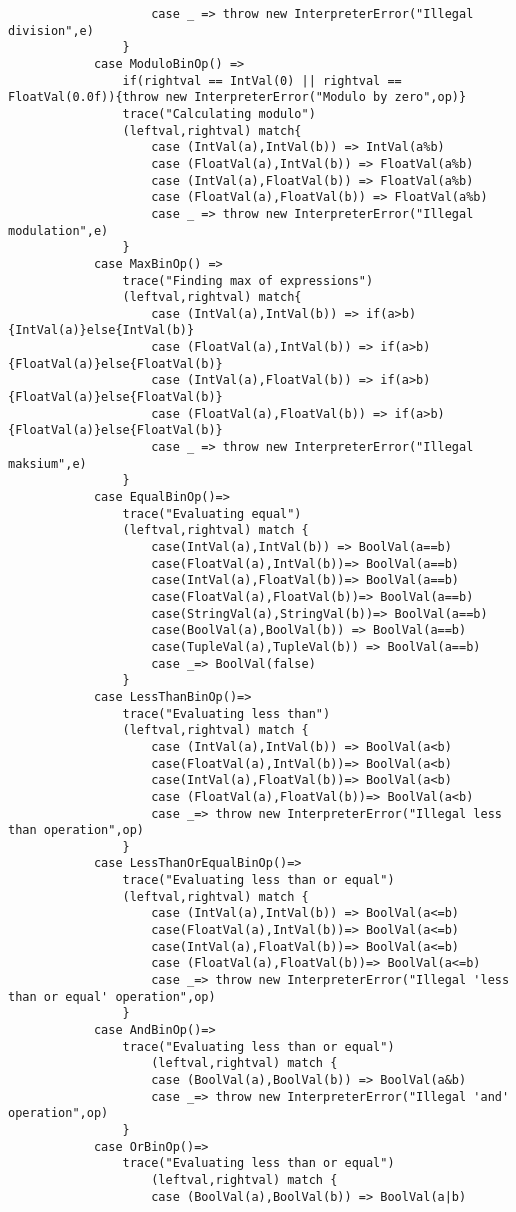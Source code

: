 \documentclass[a4paper, 10pt]{article}
\begin{document}
\begin{lstlisting}
					case _ => throw new InterpreterError("Illegal division",e)
				}
			case ModuloBinOp() =>
				if(rightval == IntVal(0) || rightval == FloatVal(0.0f)){throw new InterpreterError("Modulo by zero",op)}
				trace("Calculating modulo")
				(leftval,rightval) match{
					case (IntVal(a),IntVal(b)) => IntVal(a%b)
					case (FloatVal(a),IntVal(b)) => FloatVal(a%b)
					case (IntVal(a),FloatVal(b)) => FloatVal(a%b)
					case (FloatVal(a),FloatVal(b)) => FloatVal(a%b)
					case _ => throw new InterpreterError("Illegal modulation",e)
				}
			case MaxBinOp() =>
				trace("Finding max of expressions")
				(leftval,rightval) match{
					case (IntVal(a),IntVal(b)) => if(a>b){IntVal(a)}else{IntVal(b)}
					case (FloatVal(a),IntVal(b)) => if(a>b){FloatVal(a)}else{FloatVal(b)}
					case (IntVal(a),FloatVal(b)) => if(a>b){FloatVal(a)}else{FloatVal(b)}
					case (FloatVal(a),FloatVal(b)) => if(a>b){FloatVal(a)}else{FloatVal(b)}
					case _ => throw new InterpreterError("Illegal maksium",e)
				}
			case EqualBinOp()=>
				trace("Evaluating equal")
				(leftval,rightval) match {
					case(IntVal(a),IntVal(b)) => BoolVal(a==b)
					case(FloatVal(a),IntVal(b))=> BoolVal(a==b)
					case(IntVal(a),FloatVal(b))=> BoolVal(a==b)
					case(FloatVal(a),FloatVal(b))=> BoolVal(a==b)
					case(StringVal(a),StringVal(b))=> BoolVal(a==b)
					case(BoolVal(a),BoolVal(b)) => BoolVal(a==b)
					case(TupleVal(a),TupleVal(b)) => BoolVal(a==b)
					case _=> BoolVal(false)
				}
			case LessThanBinOp()=>
				trace("Evaluating less than")
				(leftval,rightval) match {
					case (IntVal(a),IntVal(b)) => BoolVal(a<b)
					case(FloatVal(a),IntVal(b))=> BoolVal(a<b)
					case(IntVal(a),FloatVal(b))=> BoolVal(a<b)
					case (FloatVal(a),FloatVal(b))=> BoolVal(a<b)
					case _=> throw new InterpreterError("Illegal less than operation",op)
				}
			case LessThanOrEqualBinOp()=>
				trace("Evaluating less than or equal")
				(leftval,rightval) match {
					case (IntVal(a),IntVal(b)) => BoolVal(a<=b)
					case(FloatVal(a),IntVal(b))=> BoolVal(a<=b)
					case(IntVal(a),FloatVal(b))=> BoolVal(a<=b)
					case (FloatVal(a),FloatVal(b))=> BoolVal(a<=b)
					case _=> throw new InterpreterError("Illegal 'less than or equal' operation",op)
				}
			case AndBinOp()=>
				trace("Evaluating less than or equal")
					(leftval,rightval) match {
					case (BoolVal(a),BoolVal(b)) => BoolVal(a&b)
					case _=> throw new InterpreterError("Illegal 'and' operation",op)
				}
			case OrBinOp()=>
				trace("Evaluating less than or equal")
					(leftval,rightval) match {
					case (BoolVal(a),BoolVal(b)) => BoolVal(a|b)

\end{lstlisting}
\end{document}
